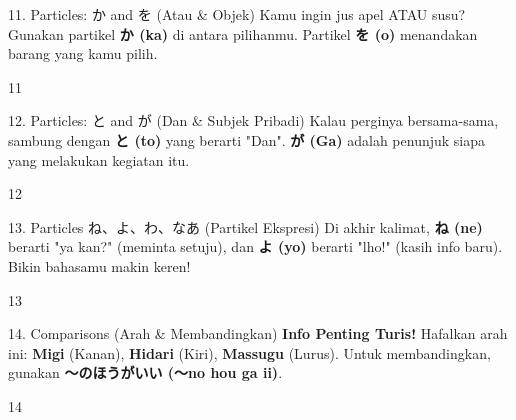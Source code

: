 \begin{lessonbox}{11. Particles: か and を (Atau \& Objek)}
    Kamu ingin jus apel ATAU susu? Gunakan partikel \textbf{か (ka)} di antara pilihanmu. Partikel \textbf{を (o)} menandakan barang yang kamu pilih.
\end{lessonbox}
\begin{convobox}{11}
    \noindent
      
      

    \vspace{1.5em}
\end{convobox}

\begin{lessonbox}{12. Particles: と and が (Dan \& Subjek Pribadi)}
    Kalau perginya bersama-sama, sambung dengan \textbf{と (to)} yang berarti "Dan". \textbf{が (Ga)} adalah penunjuk siapa yang melakukan kegiatan itu.
\end{lessonbox}
\begin{convobox}{12}
    \noindent
      
      

    \vspace{1.5em}
\end{convobox}

\begin{lessonbox}{13. Particles ね、よ、わ、なあ (Partikel Ekspresi)}
    Di akhir kalimat, \textbf{ね (ne)} berarti "ya kan?" (meminta setuju), dan \textbf{よ (yo)} berarti "lho!" (kasih info baru). Bikin bahasamu makin keren!
\end{lessonbox}
\begin{convobox}{13}
    \noindent
     

    \vspace{1.5em}
\end{convobox}

\begin{lessonbox}{14. Comparisons (Arah \& Membandingkan)}
    \textbf{Info Penting Turis!} Hafalkan arah ini: \textbf{Migi} (Kanan), \textbf{Hidari} (Kiri), \textbf{Massugu} (Lurus). Untuk membandingkan, gunakan \textbf{〜のほうがいい (〜no hou ga ii)}.
\end{lessonbox}
\begin{convobox}{14}
    \noindent
      
      

    \vspace{1.5em}
\end{convobox}

